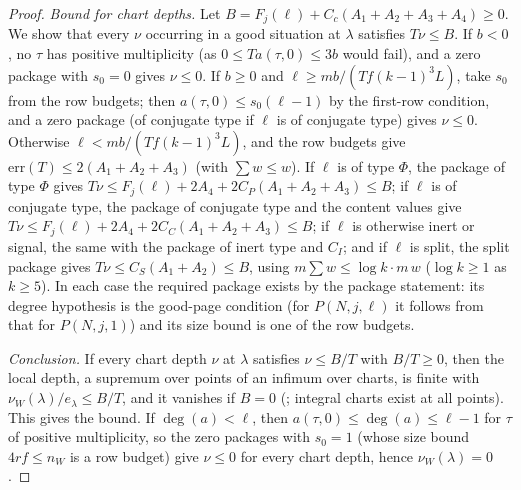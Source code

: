 \begin{proof}
\emph{Bound for chart depths.} Let $B=F_j(\ell)+C_c(A_1+A_2+A_3+A_4)\ge0$. We show that every $\nu$ occurring in a good situation at
$\lambda$ satisfies $T\nu\le B$. If $b<0$, no $\tau$ has positive multiplicity (as $0\le Ta(\tau,0)\le3b$ would fail), and a zero
package with $s_0=0$ gives $\nu\le0$. If $b\ge0$ and $\ell\ge mb/(Tf(k-1)^3L)$, take $s_0$ from the row budgets; then
$a(\tau,0)\le s_0(\ell-1)$ by the first-row condition, and a zero package (of conjugate type if $\ell$ is of conjugate type) gives
$\nu\le0$. Otherwise $\ell<mb/(Tf(k-1)^3L)$, and the row budgets give $\mathrm{err}(T)\le2(A_1+A_2+A_3)$ (with $\sum w\le w$). If $\ell$ is of
type $\Phi$, the package of type $\Phi$ gives $T\nu\le F_j(\ell)+2A_4+2C_P(A_1+A_2+A_3)\le B$; if $\ell$ is of conjugate type, the
package of conjugate type and the content values give $T\nu\le F_j(\ell)+2A_4+2C_C(A_1+A_2+A_3)\le B$; if $\ell$ is otherwise inert or
signal, the same with the package of inert type and $C_I$; and if $\ell$ is split, the split package gives
$T\nu\le C_S(A_1+A_2)\le B$, using $m\sum w\le\log k\cdot m\,w$ ($\log k\ge1$ as $k\ge5$). In each case the required package exists by
the package statement: its degree hypothesis is the good-page condition (for $P(N,j,\ell)$ it follows from that for $P(N,j,1)$) and
its size bound is one of the row budgets.

\emph{Conclusion.} If every chart depth $\nu$ at $\lambda$ satisfies $\nu\le B/T$ with $B/T\ge0$, then the local depth, a supremum over
points of an infimum over charts, is finite with $\nu_W(\lambda)/e_\lambda\le B/T$, and it vanishes if $B=0$
(; integral charts exist at all points). This gives the bound. If
$\deg(a)<\ell$, then $a(\tau,0)\le\deg(a)\le\ell-1$ for $\tau$ of positive multiplicity, so the zero packages with $s_0=1$ (whose size
bound $4rf\le n_W$ is a row budget) give $\nu\le0$ for every chart depth, hence $\nu_W(\lambda)=0$.
\end{proof}

